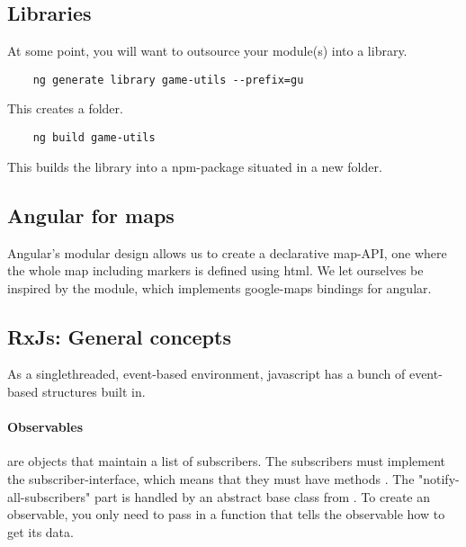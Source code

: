 \subsection{Libraries}
At some point, you will want to outsource your module(s) into a library.
\begin{lstlisting}
    ng generate library game-utils --prefix=gu
\end{lstlisting}
This creates a  folder.
\begin{lstlisting}
    ng build game-utils
\end{lstlisting}
This builds the library into a npm-package situated in a new  folder.

\subsection{Angular for maps}
Angular's modular design allows us to create a declarative map-API, one where the whole map including markers is defined using html. We let ourselves be inspired by the  module, which implements google-maps bindings for angular. 
 



\subsection{RxJs: General concepts}

As a singlethreaded, event-based environment, javascript has a bunch of event-based structures built in.

\paragraph{Observables} are objects that maintain a list of subscribers. The subscribers must implement the subscriber-interface, which means that they must have methods .
The "notify-all-subscribers" part is handled by an abstract base class from . To create an observable, you only need to pass in a function that tells the observable how to  get its data.



